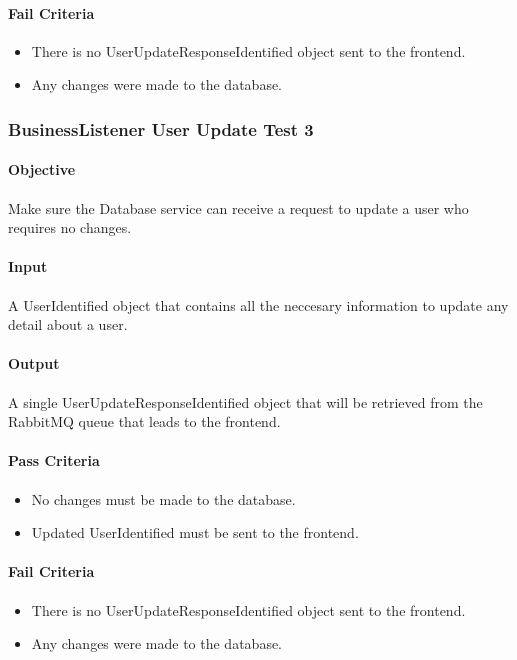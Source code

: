 \documentclass[hidelinks,english]{article}
\begin{document}
				\paragraph{Fail Criteria}
				\begin{itemize}
					\item There is no UserUpdateResponseIdentified object sent to the frontend.
					\item Any changes were made to the database.
				\end{itemize}
				
			\subsubsection{BusinessListener User Update Test 3}\label{databasebusinesslistenerupdatetest5}
				\paragraph{Objective} Make sure the Database service can receive a request to update a user who requires no changes.
				\paragraph{Input} A UserIdentified object that contains all the neccesary information to update any detail about a user.
				\paragraph{Output} A single UserUpdateResponseIdentified object that will be retrieved from the RabbitMQ queue that leads to the frontend.
				\paragraph{Pass Criteria}
				\begin{itemize}
					\item No changes must be made to the database.
					\item Updated UserIdentified must be sent to the frontend.
				\end{itemize}
				\paragraph{Fail Criteria}
				\begin{itemize}
					\item There is no UserUpdateResponseIdentified object sent to the frontend.
					\item Any changes were made to the database.
				\end{itemize}
				
\end{document}
